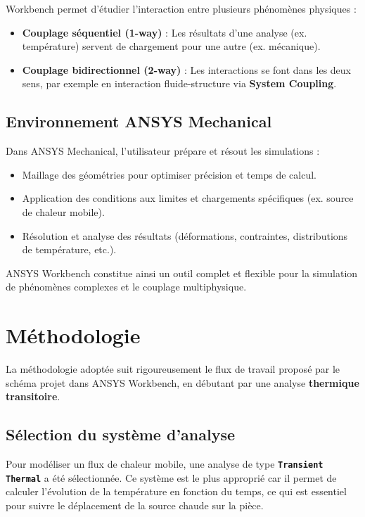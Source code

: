 \documentclass{rapportECL}
\begin{document}
Workbench permet d’étudier l’interaction entre plusieurs phénomènes physiques :  
\begin{itemize}
    \item \textbf{Couplage séquentiel (1-way)} : Les résultats d’une analyse (ex. température) servent de chargement pour une autre (ex. mécanique).  
    \item \textbf{Couplage bidirectionnel (2-way)} : Les interactions se font dans les deux sens, par exemple en interaction fluide-structure via \textbf{System Coupling}.
\end{itemize}

\subsection{Environnement ANSYS Mechanical}

Dans ANSYS Mechanical, l’utilisateur prépare et résout les simulations :  
\begin{itemize}
    \item Maillage des géométries pour optimiser précision et temps de calcul.  
    \item Application des conditions aux limites et chargements spécifiques (ex. source de chaleur mobile).  
    \item Résolution et analyse des résultats (déformations, contraintes, distributions de température, etc.).
\end{itemize}

ANSYS Workbench constitue ainsi un outil complet et flexible pour la simulation de phénomènes complexes et le couplage multiphysique.

\section{Méthodologie}

La méthodologie adoptée suit rigoureusement le flux de travail proposé par le schéma projet dans ANSYS Workbench, en débutant par une analyse \textbf{thermique transitoire}.

\subsection{Sélection du système d’analyse}

Pour modéliser un flux de chaleur mobile, une analyse de type \textbf{\texttt{Transient Thermal}} a été sélectionnée. Ce système est le plus approprié car il permet de calculer l’évolution de la température en fonction du temps, ce qui est essentiel pour suivre le déplacement de la source chaude sur la pièce.
\end{document}
